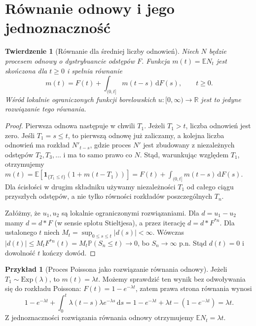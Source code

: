 \documentclass[11pt,a4paper,oneside]{report}
\numberwithin{equation}{chapter}
\theoremstyle{plain}
\newtheorem{twierdzenie}{Twierdzenie}[chapter]
\theoremstyle{definition}
\newtheorem{przyklad}{Przykład}[chapter]
\theoremstyle{remark}
\newcommand{\R}{\mathbb{R}}
\newcommand{\Prob}{\mathbb{P}}
\newcommand{\E}{\mathbb{E}}
\newcommand{\ind}[1]{\mathbf{1}_{#1}}
\newcommand{\dd}{\mathrm{d}}
\begin{document}
\section{Równanie odnowy i jego jednoznaczność}
\begin{twierdzenie}[Równanie dla średniej liczby odnowień]
Niech $N$ będzie procesem odnowy o dystrybuancie
odstępów $F$. Funkcja $m(t)=\E N_t$ jest skończona
dla $t\ge0$ i spełnia równanie
\[
m(t)=F(t)+\int_{(0,t]}m(t-s)\,\dd F(s),\qquad t\ge0.
\]
Wśród lokalnie ograniczonych funkcji borelowskich
$u:[0,\infty)\to\R$ jest to jedyne rozwiązanie tego równania.
\end{twierdzenie}
\begin{proof}
Pierwsza odnowa następuje w chwili $T_1$. Jeżeli $T_1>t$,
liczba odnowień jest zero. Jeśli $T_1=s\le t$,
to pierwszą odnowę już zaliczamy, a kolejna liczba
odnowień ma rozkład $N'_{t-s}$, gdzie proces $N'$ jest
zbudowany z niezależnych odstępów $T_2,T_3,\ldots$
i ma to samo prawo co $N$. Stąd, warunkując względem
$T_1$, otrzymujemy
$m(t)=\E[\ind{\{T_1\le t\}}(1+m(t-T_1))]
=F(t)+\int_{(0,t]}m(t-s)\,\dd F(s)$.
Dla ścisłości w drugim składniku używamy niezależności
$T_1$ od całego ciągu przyszłych odstępów, a nie tylko
równości rozkładów poszczególnych $T_n$.

Załóżmy, że $u_1,u_2$ są lokalnie ograniczonymi rozwiązaniami.
Dla $d=u_1-u_2$ mamy $d=d*F$ (w sensie splotu
Stieltjesa), a przez iterację $d=d*F^{*n}$.
Dla ustalonego $t$ niech $M_t=\sup_{0\le s\le t}|d(s)|<\infty$.
Wówczas
$|d(t)|\le M_t F^{*n}(t)=M_t\Prob(S_n\le t)\to0$,
bo $S_n\to\infty$ p.n. Stąd $d(t)=0$ i dowolność $t$
kończy dowód.
\end{proof}

\begin{przyklad}[Proces Poissona jako rozwiązanie równania odnowy]
Jeżeli $T_1\sim\mathrm{Exp}(\lambda)$, to $m(t)=\lambda t$.
Możemy sprawdzić ten wynik bez odwoływania się do rozkładu Poissona:
$F(t)=1-e^{-\lambda t}$, zatem prawa strona równania wynosi
\[
1-e^{-\lambda t}
+\int_0^t\lambda(t-s)\lambda e^{-\lambda s}\,\dd s
=1-e^{-\lambda t}+\lambda t-(1-e^{-\lambda t})
=\lambda t.
\]
Z jednoznaczności rozwiązania równania odnowy otrzymujemy
$\E N_t=\lambda t$.
\end{przyklad}
\end{document}
